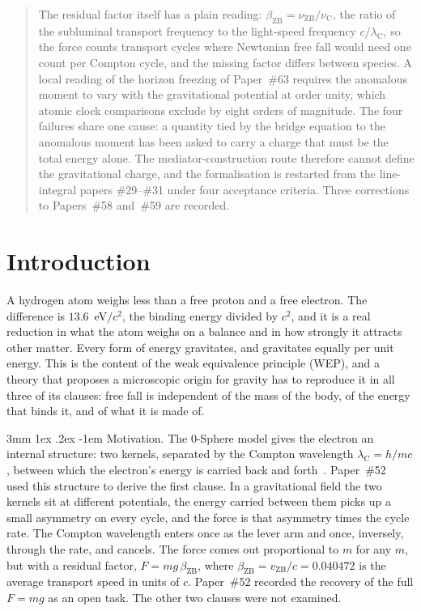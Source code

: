 \documentclass[%
 reprint, amsmath,amssymb, aps, prb, ]{revtex4-2}
\makeatletter
\numberwithin{equation}{section}
\renewcommand\paragraph{%
  \@startsection{paragraph}{4}{\z@}%
    {3mm \@plus 1ex \@minus .2ex}%
    {-1em}%
    {\normalfont\normalsize\itshape}}
\newcommand{\vZB}{v_{\text{ZB}}}
\newcommand{\betaZB}{\beta_{\text{ZB}}}
\newcommand{\lambdaC}{\lambda_{\text{C}}}
\newcommand{\nuZB}{\nu_{\text{ZB}}}
\newcommand{\nuC}{\nu_{\text{C}}}
\makeatother
\begin{document}
\begin{abstract}
The residual factor itself has a plain reading: $\betaZB = \nuZB/\nuC$, the ratio of the subluminal transport frequency to the light-speed frequency $c/\lambdaC$, so the force counts transport cycles where Newtonian free fall would need one count per Compton cycle, and the missing factor differs between species.
A local reading of the horizon freezing of Paper~\#63 requires the anomalous moment to vary with the gravitational potential at order unity, which atomic clock comparisons exclude by eight orders of magnitude.
The four failures share one cause: a quantity tied by the bridge equation to the anomalous moment has been asked to carry a charge that must be the total energy alone.
The mediator-construction route therefore cannot define the gravitational charge, and the formalisation is restarted from the line-integral papers \#29--\#31 under four acceptance criteria.
Three corrections to Papers~\#58 and~\#59 are recorded.
\end{abstract}

\maketitle

\section{Introduction}
\label{sec:intro}

A hydrogen atom weighs less than a free proton and a free electron. The difference is $13.6$~eV$/c^{2}$, the binding energy divided by $c^{2}$, and it is a real reduction in what the atom weighs on a balance and in how strongly it attracts other matter. Every form of energy gravitates, and gravitates equally per unit energy. This is the content of the weak equivalence principle (WEP), and a theory that proposes a microscopic origin for gravity has to reproduce it in all three of its clauses: free fall is independent of the mass of the body, of the energy that binds it, and of what it is made of.

\paragraph{Motivation.} The 0-Sphere model gives the electron an internal structure: two kernels, separated by the Compton wavelength $\lambdaC = h/mc$, between which the electron's energy is carried back and forth~\cite{hanamura01,hanamura10,hanamura65}. Paper~\#52~\cite{hanamura52} used this structure to derive the first clause. In a gravitational field the two kernels sit at different potentials, the energy carried between them picks up a small asymmetry on every cycle, and the force is that asymmetry times the cycle rate. The Compton wavelength enters once as the lever arm and once, inversely, through the rate, and cancels. The force comes out proportional to $m$ for any $m$, but with a residual factor, $F = mg\,\betaZB$, where $\betaZB = \vZB/c = 0.040472$ is the average transport speed in units of $c$. Paper~\#52 recorded the recovery of the full $F = mg$ as an open task. The other two clauses were not examined.
\end{document}
